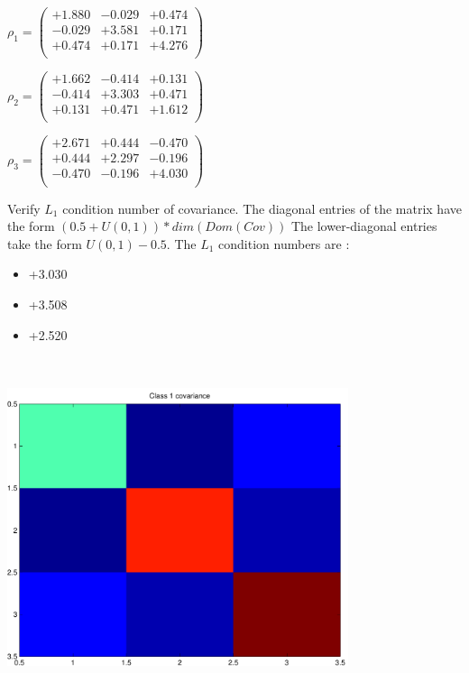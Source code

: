 \documentclass[9pt]{article}
\theoremstyle{plain}
\theoremstyle{definition}
\theoremstyle{remark}
\numberwithin{equation}{section}
\begin{document}
$\rho_1 = \left(
\begin{array}{
ccc}
+1.880 & -0.029 & +0.474 \\
-0.029 & +3.581 & +0.171 \\
+0.474 & +0.171 & +4.276 \\
\end{array}
\right)$ \newline 

$\rho_2 = \left(
\begin{array}{
ccc}
+1.662 & -0.414 & +0.131 \\
-0.414 & +3.303 & +0.471 \\
+0.131 & +0.471 & +1.612 \\
\end{array}
\right)$ \newline 

$\rho_3 = \left(
\begin{array}{
ccc}
+2.671 & +0.444 & -0.470 \\
+0.444 & +2.297 & -0.196 \\
-0.470 & -0.196 & +4.030 \\
\end{array}
\right)$ \newline 

Verify $L_1$ condition number of covariance. The diagonal entries of the matrix have the form $(0.5 + U(0,1) )*dim(Dom(Cov))$
The lower-diagonal entries take the form $U(0,1) - 0.5$. 
The $L_1$ condition numbers are :
\begin{itemize}
\item +3.030
\item +3.508
\item +2.520
\end{itemize}
\includegraphics[width=10.0cm,height=10.0cm]{rv1_corr.pdf}
\end{document}
